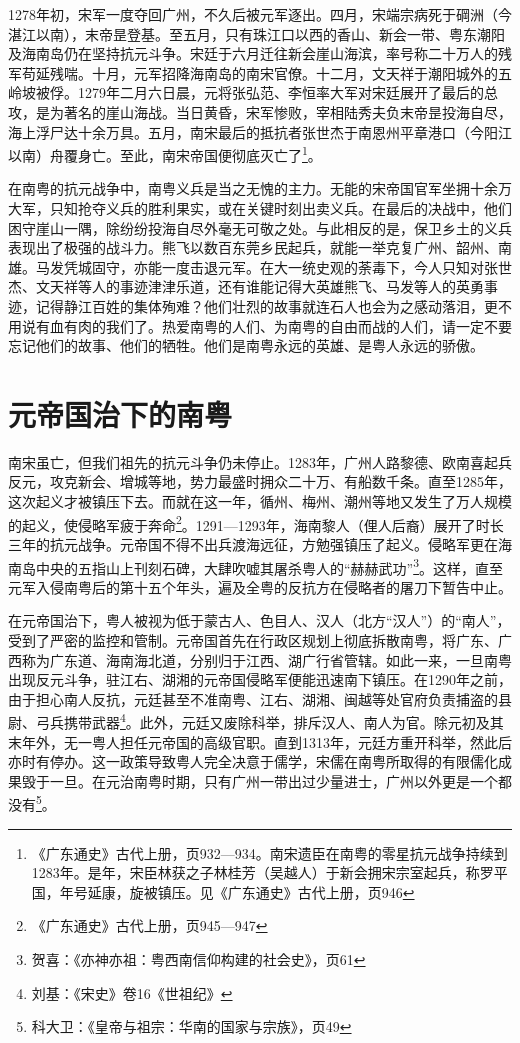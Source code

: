 1278年初，宋军一度夺回广州，不久后被元军逐出。四月，宋端宗病死于碙洲（今湛江以南），末帝昰登基。至五月，只有珠江口以西的香山、新会一带、粤东潮阳及海南岛仍在坚持抗元斗争。宋廷于六月迁往新会崖山海滨，率号称二十万人的残军苟延残喘。十月，元军招降海南岛的南宋官僚。十二月，文天祥于潮阳城外的五岭坡被俘。1279年二月六日晨，元将张弘范、李恒率大军对宋廷展开了最后的总攻，是为著名的崖山海战。当日黄昏，宋军惨败，宰相陆秀夫负末帝昰投海自尽，海上浮尸达十余万具。五月，南宋最后的抵抗者张世杰于南恩州平章港口（今阳江以南）舟覆身亡。至此，南宋帝国便彻底灭亡了\footnote{《广东通史》古代上册，页932—934。南宋遗臣在南粤的零星抗元战争持续到1283年。是年，宋臣林获之子林桂芳（吴越人）于新会拥宋宗室起兵，称罗平国，年号延康，旋被镇压。见《广东通史》古代上册，页946}。

在南粤的抗元战争中，南粤义兵是当之无愧的主力。无能的宋帝国官军坐拥十余万大军，只知抢夺义兵的胜利果实，或在关键时刻出卖义兵。在最后的决战中，他们困守崖山一隅，除纷纷投海自尽外毫无可敬之处。与此相反的是，保卫乡土的义兵表现出了极强的战斗力。熊飞以数百东莞乡民起兵，就能一举克复广州、韶州、南雄。马发凭城固守，亦能一度击退元军。在大一统史观的荼毒下，今人只知对张世杰、文天祥等人的事迹津津乐道，还有谁能记得大英雄熊飞、马发等人的英勇事迹，记得静江百姓的集体殉难？他们壮烈的故事就连石人也会为之感动落泪，更不用说有血有肉的我们了。热爱南粤的人们、为南粤的自由而战的人们，请一定不要忘记他们的故事、他们的牺牲。他们是南粤永远的英雄、是粤人永远的骄傲。


\section{元帝国治下的南粤}


南宋虽亡，但我们祖先的抗元斗争仍未停止。1283年，广州人路黎德、欧南喜起兵反元，攻克新会、增城等地，势力最盛时拥众二十万、有船数千条。直至1285年，这次起义才被镇压下去。而就在这一年，循州、梅州、潮州等地又发生了万人规模的起义，使侵略军疲于奔命\footnote{《广东通史》古代上册，页945—947}。1291—1293年，海南黎人（俚人后裔）展开了时长三年的抗元战争。元帝国不得不出兵渡海远征，方勉强镇压了起义。侵略军更在海南岛中央的五指山上刊刻石碑，大肆吹嘘其屠杀粤人的“赫赫武功”\footnote{贺喜：《亦神亦祖：粤西南信仰构建的社会史》，页61}。这样，直至元军入侵南粤后的第十五个年头，遍及全粤的反抗方在侵略者的屠刀下暂告中止。

在元帝国治下，粤人被视为低于蒙古人、色目人、汉人（北方“汉人”）的“南人”，受到了严密的监控和管制。元帝国首先在行政区规划上彻底拆散南粤，将广东、广西称为广东道、海南海北道，分别归于江西、湖广行省管辖。如此一来，一旦南粤出现反元斗争，驻江右、湖湘的元帝国侵略军便能迅速南下镇压。在1290年之前，由于担心南人反抗，元廷甚至不准南粤、江右、湖湘、闽越等处官府负责捕盗的县尉、弓兵携带武器\footnote{刘基：《宋史》卷16《世祖纪》}。此外，元廷又废除科举，排斥汉人、南人为官。除元初及其末年外，无一粤人担任元帝国的高级官职。直到1313年，元廷方重开科举，然此后亦时有停办。这一政策导致粤人完全决意于儒学，宋儒在南粤所取得的有限儒化成果毁于一旦。在元治南粤时期，只有广州一带出过少量进士，广州以外更是一个都没有\footnote{科大卫：《皇帝与祖宗：华南的国家与宗族》，页49}。

